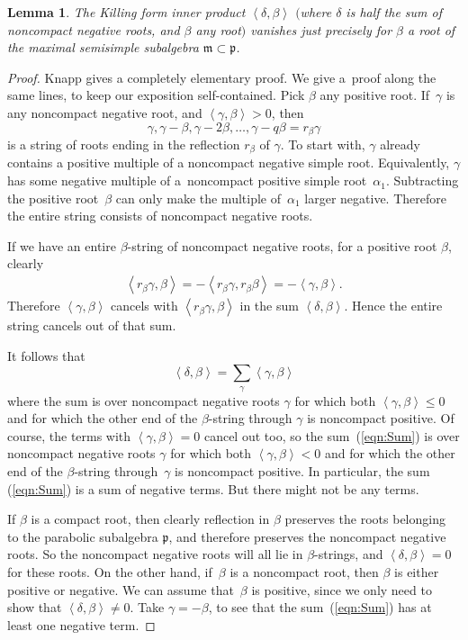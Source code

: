 \documentclass[11pt]{article}
\newtheorem{lemma}{Lemma}
\newcommand{\gstruc}{\mathfrak{p}}
\begin{document}
\begin{lemma}
The Killing form inner product
\(
\left<\delta, \beta\right>
\)
$($where $\delta$ is half the sum of noncompact negative roots, and $\beta$
any root$)$ vanishes
just precisely for $\beta$ a root of the
maximal semisimple subalgebra $\mathfrak{m} \subset \gstruc$.
\end{lemma}
\begin{proof} Knapp \cite[Corollary 5.100, p.~330]{Knapp:2002}
gives a completely elementary proof. We give a~proof along
the same lines, to keep our exposition self-contained.
Pick $\beta$ any positive root. If~$\gamma$ is any
noncompact negative root, and $\left<\gamma,\beta\right> > 0$,
then
\[
\gamma, \gamma-\beta, \gamma-2   \beta, \dots, \gamma-q   \beta = r_{\beta} \gamma
\]
is a string of roots ending in the ref\/lection $r_{\beta}$ of $\gamma$.
To start with, $\gamma$ already contains a positive
multiple of a noncompact negative simple root. Equivalently, $\gamma$
has some negative multiple of a~noncompact positive simple root~$\alpha_1$.
Subtracting the positive
root~$\beta$ can only make the multiple of~$\alpha_1$
larger negative. Therefore the entire string consists
of noncompact negative roots.

If we have an entire $\beta$-string of noncompact
negative roots, for a positive
root $\beta$, clearly
\begin{gather*}
\left<r_{\beta} \gamma,\beta\right>
 = -\left<r_{\beta} \gamma, r_{\beta} \beta\right>
 =
-\left<\gamma,\beta\right>.
\end{gather*}
Therefore $\left<\gamma,\beta\right>$ cancels with $\left<r_{\beta}
\gamma,\beta\right>$ in the sum $\left<\delta,\beta\right>$. Hence
the entire string cancels out of that sum.

It follows that
\begin{equation}\label{eqn:Sum}
\left<\delta,\beta\right>=
\sum_{\gamma} \left<\gamma,\beta\right>
\end{equation}
where the sum is over noncompact negative roots $\gamma$
for which both $\left<\gamma,\beta\right> \le 0$
and for which the other end of the $\beta$-string
through $\gamma$ is noncompact positive.
Of course, the terms with  $\left<\gamma,\beta\right> = 0$
cancel out too, so the sum~(\ref{eqn:Sum}) is over
noncompact negative roots $\gamma$ for
which both $\left<\gamma,\beta\right> < 0$
and for which the other end of the $\beta$-string
through~$\gamma$ is noncompact positive. In particular,
the sum (\ref{eqn:Sum}) is a sum of negative terms.
But there might not be any terms.

If $\beta$ is a compact root, then clearly ref\/lection in
$\beta$ preserves the roots belonging to the parabolic subalgebra
$\gstruc$, and therefore preserves the noncompact negative roots.
So the noncompact negative roots will all lie in $\beta$-strings, and
$\left<\delta,\beta\right>=0$ for these roots. On the other hand, if~$\beta$ is a noncompact root, then $\beta$
is either positive or negative. We can assume that~$\beta$ is positive, since we only need to show that $\left<\delta,\beta\right> \ne 0$. Take
$\gamma=-\beta$, to see that the sum~(\ref{eqn:Sum}) has at least
one negative term.
\end{proof}
\end{document}
